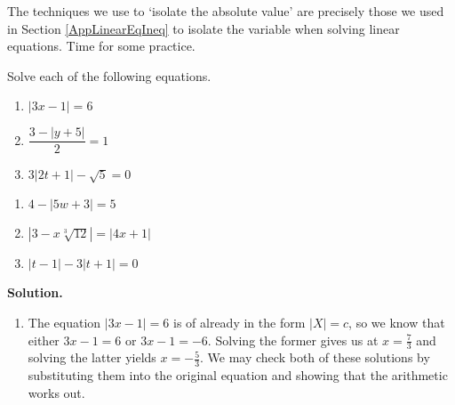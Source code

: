\documentclass{ximera}
\begin{document}
The techniques we use to `isolate the absolute value' are precisely those we used in Section \ref{AppLinearEqIneq} to isolate the variable when solving linear equations.  Time for some practice.

\enlargethispage{.5in}

\begin{example} \label{absvalueeqnex}  Solve each of the following equations.

\vspace*{-.1in}

\begin{multicols}{3}
\begin{enumerate}

\item  $|3x-1| = 6$
\item  $\dfrac{3 - |y+5|}{2} = 1$
\item  $3|2t+1| - \sqrt{5} = 0$

\setcounter{HW}{\value{enumi}}
\end{enumerate}
\end{multicols}

\vspace*{-.3in}

\begin{multicols}{3}
\begin{enumerate}
\setcounter{enumi}{\value{HW}}

\item  $4 - |5w+3| = 5$

\item  $\left|3 - x \sqrt[3]{12}\right| = |4x+1|$

\item  $|t-1| - 3|t+1| = 0$

\end{enumerate}
\end{multicols}

\pagebreak

{\bf Solution.} 

\begin{enumerate}

\item  The equation  $|3x-1| = 6$ is of already in the form $|X| = c$, so we know that either $3x-1=6$ or $3x-1 = -6$.  Solving the former gives us at $x = \frac{7}{3}$ and solving the latter yields $x = -\frac{5}{3}$.  We may check both of these solutions by substituting them into the original equation and showing that the arithmetic works out.


\end{enumerate}
\end{example}
\end{document}

